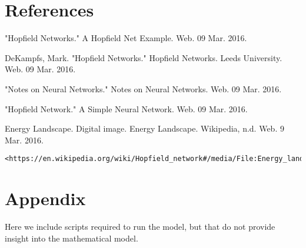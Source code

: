 \documentclass[]{article}
\theoremstyle{plain}
\theoremstyle{definition}
\begin{document}
\section{References}
"Hopfield Networks." A Hopfield Net Example. Web. 09 Mar. 2016. 

DeKampfs, Mark. "Hopfield Networks." Hopfield Networks. Leeds University. Web. 09 Mar. 2016.

"Notes on Neural Networks." Notes on Neural Networks. Web. 09 Mar. 2016.

"Hopfield Network." A Simple Neural Network. Web. 09 Mar. 2016.

Energy Landscape. Digital image. Energy Landscape. Wikipedia, n.d. Web. 9 Mar. 2016. \begin{verbatim}
<https://en.wikipedia.org/wiki/Hopfield_network#/media/File:Energy_landscape.png>
\end{verbatim}

\newpage

\section{Appendix}
Here we include scripts required to run the model, but that do not provide insight into the mathematical model. 
\end{document}
